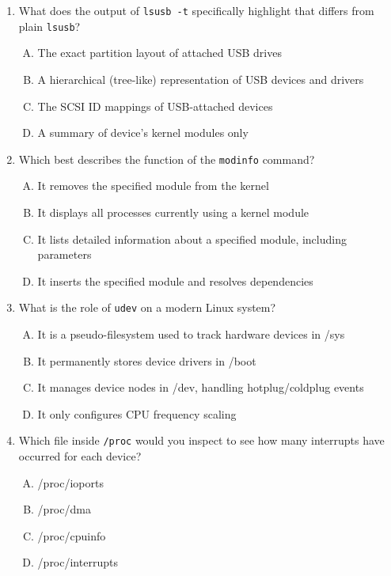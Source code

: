 \documentclass[12pt,a4paper]{report}
\begin{document}
\begin{enumerate}[1.]
\item What does the output of \texttt{lsusb -t} specifically highlight that differs from plain \texttt{lsusb}?
  \begin{enumerate}[A)]
    \item The exact partition layout of attached USB drives
    \item A hierarchical (tree-like) representation of USB devices and drivers
    \item The SCSI ID mappings of USB-attached devices
    \item A summary of device's kernel modules only
  \end{enumerate}

\item Which best describes the function of the \texttt{modinfo} command?
  \begin{enumerate}[A)]
    \item It removes the specified module from the kernel
    \item It displays all processes currently using a kernel module
    \item It lists detailed information about a specified module, including parameters
    \item It inserts the specified module and resolves dependencies
  \end{enumerate}

\item What is the role of \texttt{udev} on a modern Linux system?
  \begin{enumerate}[A)]
    \item It is a pseudo-filesystem used to track hardware devices in /sys
    \item It permanently stores device drivers in /boot
    \item It manages device nodes in /dev, handling hotplug/coldplug events
    \item It only configures CPU frequency scaling
  \end{enumerate}

\item Which file inside \texttt{/proc} would you inspect to see how many interrupts have occurred for each device?
  \begin{enumerate}[A)]
    \item /proc/ioports
    \item /proc/dma
    \item /proc/cpuinfo
    \item /proc/interrupts
  \end{enumerate}


\end{enumerate}
\end{document}
